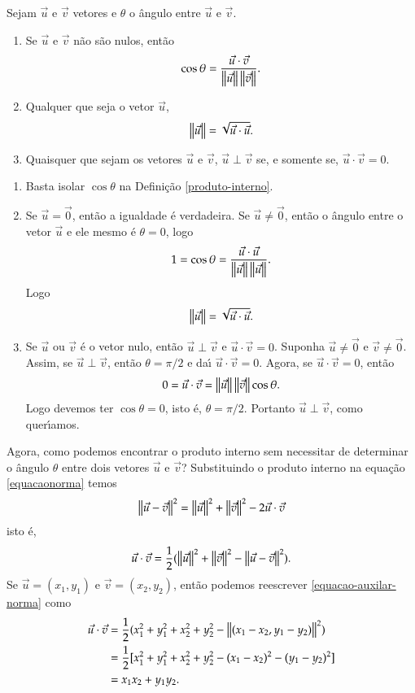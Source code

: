 \begin{proposicao}
  Sejam $\vec{u}$ e $\vec{v}$ vetores e $\theta$ o \^angulo entre $\vec{u}$ e $\vec{v}$.
  \begin{enumerate}
    \item Se $\vec{u}$ e $\vec{v}$ n\~ao s\~ao nulos, ent\~ao
    \[
      \cos\theta = \dfrac{\vec{u}\cdot\vec{v}}{\left\Vert{\vec{u}}\right\Vert\left\Vert{\vec{v}}\right\Vert}.
    \]
    \item Qualquer que seja o vetor $\vec{u}$,
    \[
      \left\Vert{\vec{u}}\right\Vert = \sqrt{\vec{u}\cdot\vec{u}}.
    \]
    \item Quaisquer que sejam os vetores $\vec{u}$ e $\vec{v}$, $\vec{u}\perp\vec{v}$ se, e somente se, $\vec{u}\cdot\vec{v} = 0$.
    \end{enumerate}
\end{proposicao}
\begin{prova}
  \begin{enumerate}
    \item Basta isolar $\cos\theta$ na Defini\c{c}\~ao \ref{produto-interno}.
    \item Se $\vec{u} = \vec{0}$, ent\~ao a igualdade \'e verdadeira. Se $\vec{u} \ne \vec{0}$, ent\~ao o \^angulo entre o vetor $\vec{u}$ e ele mesmo \'e $\theta = 0$, logo
    \[
      1 = \cos\theta = \dfrac{\vec{u}\cdot\vec{u}}{\left\Vert{\vec{u}}\right\Vert\left\Vert{\vec{u}}\right\Vert}.
    \]
    Logo
    \[
      \left\Vert{\vec{u}}\right\Vert = \sqrt{\vec{u}\cdot\vec{u}}.
    \]
    \item Se $\vec{u}$ ou $\vec{v}$ \'e o vetor nulo, ent\~ao $\vec{u}\perp\vec{v}$ e $\vec{u}\cdot\vec{v} = 0$. Suponha $\vec{u} \ne \vec{0}$ e $\vec{v} \ne \vec{0}$. Assim, se $\vec{u} \perp\vec{v}$, ent\~ao $\theta = \pi/2$ e da{\'\i} $\vec{u}\cdot\vec{v} = 0$. Agora, se $\vec{u}\cdot\vec{v} = 0$, ent\~ao
    \[
      0 = \vec{u}\cdot\vec{v} = \left\Vert{\vec{u}}\right\Vert\left\Vert{\vec{v}}\right\Vert\cos\theta.
    \]
    Logo devemos ter $\cos\theta = 0$, isto \'e, $\theta = \pi/2$. Portanto $\vec{u}\perp\vec{v}$, como quer{\'\i}amos.
  \end{enumerate}
\end{prova}

Agora, como podemos encontrar o produto interno sem necessitar de determinar o \^angulo $\theta$ entre dois vetores $\vec{u}$ e $\vec{v}$? Substituindo o produto interno na equa\c{c}\~ao \eqref{equacaonorma} temos
\[
  \left\Vert{\vec{u} - \vec{v}}\right\Vert^2 = \left\Vert{\vec{u}}\right\Vert^2 + \left\Vert{\vec{v}}\right\Vert^2 - 2\vec{u}\cdot\vec{v}
\]
isto \'e,
\begin{align}\label{equacao-auxilar-norma}
  \vec{u}\cdot\vec{v} = \dfrac{1}{2}(\left\Vert{\vec{u}}\right\Vert^2 + \left\Vert{\vec{v}}\right\Vert^2 - \left\Vert{\vec{u} - \vec{v}}\right\Vert^2).
\end{align}
Se $\vec{u} = (x_1, y_1)$ e $\vec{v} = (x_2, y_2)$, ent\~ao podemos reescrever \eqref{equacao-auxilar-norma} como
\begin{align*}
  \vec{u}\cdot\vec{v} &= \dfrac{1}{2}(x_1^2 + y_1^2 + x_2^2 + y_2^2 - \left\Vert{(x_1 - x_2, y_1 - y_2)}\right\Vert^2)\\
  &= \dfrac{1}{2}[x_1^2 + y_1^2 + x_2^2 + y_2^2 - (x_1 - x_2)^2 - (y_1 - y_2)^2]\\
  &= x_1x_2 + y_1y_2.
\end{align*}

